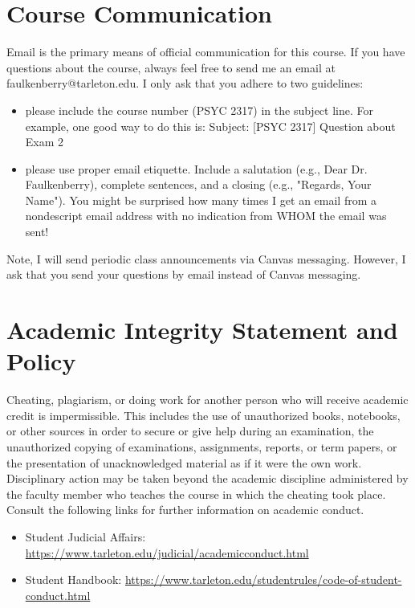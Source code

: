 \documentclass[10pt]{article}
\begin{document}
\section*{Course Communication}
\label{sec:org7dd9e23}

Email is the primary means of official communication for this course. If you have questions about the course, always feel free to send me an email at faulkenberry@tarleton.edu.  I only ask that you adhere to two guidelines:
\begin{itemize}
\item please include the course number (PSYC 2317) in the subject line.  For example, one good way to do this is:  Subject: [PSYC 2317] Question about Exam 2
\item please use proper email etiquette.  Include a salutation (e.g., Dear Dr. Faulkenberry), complete sentences, and a closing (e.g., "Regards, Your Name").  You might be surprised how many times I get an email from a nondescript email address with no indication from WHOM the email was sent!
\end{itemize}

Note, I will send periodic class announcements via Canvas messaging. However, I ask that you send your questions by email instead of Canvas messaging. 

\section*{Academic Integrity Statement and Policy}
\label{sec:orgc2e376c}

Cheating, plagiarism, or doing work for another person who will receive academic credit is impermissible. This includes the use of unauthorized books, notebooks, or other sources in order to secure or give help during an examination, the unauthorized copying of examinations, assignments, reports, or term papers, or the presentation of unacknowledged material as if it were the own work. Disciplinary action may be taken beyond the academic discipline administered by the faculty member who teaches the course in which the cheating took place. Consult the following links for further information on academic conduct. 
\begin{itemize}
\item Student Judicial Affairs: \url{https://www.tarleton.edu/judicial/academicconduct.html}
\item Student Handbook: \url{https://www.tarleton.edu/studentrules/code-of-student-conduct.html}
\end{itemize}
\end{document}

